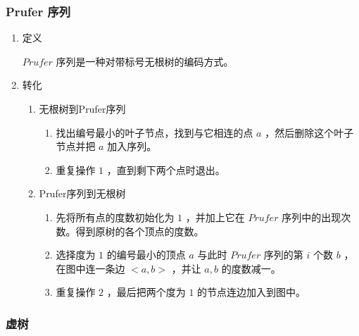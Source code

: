 \documentclass[11pt]{article}
\begin{document}
\subsubsection{Prufer 序列}
\label{sec-6-5-3}

\begin{enumerate}
\item 定义
\label{sec-6-5-3-1}

$Prufer$ 序列是一种对带标号无根树的编码方式。

\item 转化
\label{sec-6-5-3-2}

\begin{enumerate}
\item 无根树到Prufer序列
\label{sec-6-5-3-2-1}

\begin{enumerate}
\item 找出编号最小的叶子节点，找到与它相连的点 $a$ ，然后删除这个叶子节点并把 $a$ 加入序列。
\item 重复操作 $1$ ，直到剩下两个点时退出。
\end{enumerate}

\item Prufer序列到无根树
\label{sec-6-5-3-2-2}

\begin{enumerate}
\item 先将所有点的度数初始化为 $1$ ，并加上它在 $Prufer$ 序列中的出现次数。得到原树的各个顶点的度数。
\item 选择度为 $1$ 的编号最小的顶点 $a$ 与此时 $Prufer$ 序列的第 $i$ 个数 $b$ ，在图中连一条边 $<a,b>$ ，并让 $a,b$ 的度数减一。
\item 重复操作 $2$ ，最后把两个度为 $1$ 的节点连边加入到图中。
\end{enumerate}
\end{enumerate}
\end{enumerate}

\subsubsection{虚树}
\label{sec-6-5-4}
\end{document}
